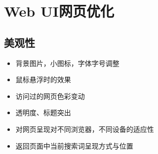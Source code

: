 \documentclass{ctexart}
\begin{document}
\section{Web UI网页优化}

\subsection{美观性} %
\begin{itemize}
\item 背景图片，小图标，字体字号调整
\item 鼠标悬浮时的效果
\item 访问过的网页色彩变动
\item 透明度、标题突出
\item 对网页呈现对不同浏览器，不同设备的适应性
\item 返回页面中当前搜索词呈现方式与位置
\end{itemize}
\end{document}
